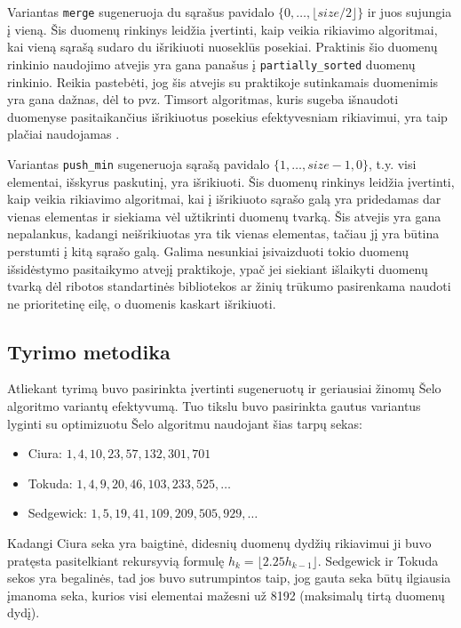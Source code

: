 \documentclass{VUMIFInfBakalaurinis}
\begin{document}
Variantas \verb|merge| sugeneruoja du sąrašus pavidalo $\{0, \dots, \lfloor size/2 \rfloor\}$ ir juos sujungia į vieną.
Šis duomenų rinkinys leidžia įvertinti, kaip veikia rikiavimo algoritmai, kai vieną sąrašą sudaro du išrikiuoti nuoseklūs posekiai.
Praktinis šio duomenų rinkinio naudojimo atvejis yra gana panašus į \verb|partially_sorted| duomenų rinkinio.
Reikia pastebėti, jog šis atvejis su praktikoje sutinkamais duomenimis yra gana dažnas, dėl to pvz.
Timsort algoritmas, kuris sugeba išnaudoti duomenyse pasitaikančius išrikiuotus posekius efektyvesniam rikiavimui, yra taip plačiai naudojamas \cite{auger2015merge}.

Variantas \verb|push_min| sugeneruoja sąrašą pavidalo $\{1, \dots, size-1, 0\}$, t.y. visi elementai, išskyrus paskutinį, yra išrikiuoti.
Šis duomenų rinkinys leidžia įvertinti, kaip veikia rikiavimo algoritmai, kai į išrikiuoto sąrašo galą yra pridedamas dar vienas elementas ir siekiama vėl užtikrinti duomenų tvarką.
Šis atvejis yra gana nepalankus, kadangi neišrikiuotas yra tik vienas elementas, tačiau jį yra būtina perstumti į kitą sąrašo galą.
Galima nesunkiai įsivaizduoti tokio duomenų išsidėstymo pasitaikymo atvejį praktikoje, ypač jei siekiant išlaikyti duomenų tvarką dėl ribotos standartinės bibliotekos ar
žinių trūkumo pasirenkama naudoti ne prioritetinę eilę, o duomenis kaskart išrikiuoti.

\subsection{Tyrimo metodika}

Atliekant tyrimą buvo pasirinkta įvertinti sugeneruotų ir geriausiai žinomų Šelo algoritmo variantų efektyvumą.
Tuo tikslu buvo pasirinkta gautus variantus lyginti su optimizuotu Šelo algoritmu naudojant šias tarpų sekas:

\begin{itemize}
  \item Ciura: $1, 4, 10, 23, 57, 132, 301, 701$ \cite{ciura2001best}
  \item Tokuda: $1, 4, 9, 20, 46, 103, 233, 525, \ldots $ \cite{tokuda1992}
  \item Sedgewick: $1, 5, 19, 41, 109, 209, 505, 929, \ldots$ \cite{SEDGEWICK1986159}
\end{itemize}

Kadangi Ciura seka yra baigtinė, didesnių duomenų dydžių rikiavimui ji buvo pratęsta pasitelkiant rekursyvią formulę $h_{k}=\lfloor 2.25h_{k-1}\rfloor$.
Sedgewick ir Tokuda sekos yra begalinės, tad jos buvo sutrumpintos taip, jog gauta seka būtų ilgiausia įmanoma seka, kurios visi elementai mažesni už 8192 (maksimalų tirtą duomenų dydį).
\end{document}
